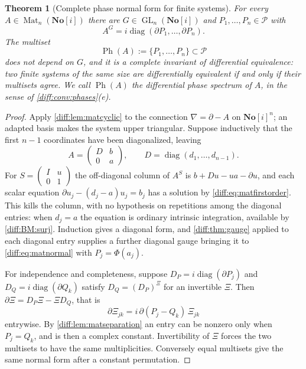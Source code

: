 \documentclass[11pt,letterpaper]{article}
\numberwithin{equation}{section}
\newtheorem{theorem}{Theorem}[section]
\theoremstyle{definition}
\theoremstyle{remark}
\newcommand{\SC}{\mathbf{No}[i]}
\newcommand{\der}{\partial}
\newcommand{\Pcl}{\mathcal P}
\newcommand{\Mat}{\operatorname{Mat}}
\newcommand{\GL}{\operatorname{GL}}
\newcommand{\Ph}{\operatorname{Ph}}
\begin{document}
\begin{theorem}[Complete phase normal form for finite systems]
\label{diff:thm:matnormal}
For every $A\in\Mat_{n}(\SC)$ there are $G\in\GL_{n}(\SC)$ and
$P_{1},\dots,P_{n}\in\Pcl$ with
\begin{equation}\label{diff:eq:matnormal}
 A^{G}=i\operatorname{diag}(\der P_{1},\dots,\der P_{n}) .
\end{equation}
The multiset
\[
 \Ph(A):=\{P_{1},\dots,P_{n}\}\subset\Pcl
\]
does not depend on $G$, and it is a \emph{complete} invariant of differential
equivalence: two finite systems of the same size are differentially equivalent
if and only if their multisets agree. We call $\Ph(A)$ the \emph{differential
phase spectrum} of $A$, in the sense of \cref{diff:conv:phases}(e).
\end{theorem}
\begin{proof}
Apply \cref{diff:lem:matcyclic} to the connection $\nabla=\der-A$ on $\SC^{n}$;
an adapted basis makes the system upper triangular. Suppose inductively that
the first $n-1$ coordinates have been diagonalized, leaving
\[
 A=\begin{pmatrix}D&b\\0&a\end{pmatrix},
 \qquad D=\operatorname{diag}(d_{1},\dots,d_{n-1}).
\]
For $S=\left(\begin{smallmatrix}I&u\\0&1\end{smallmatrix}\right)$ the
off-diagonal column of $A^{S}$ is $b+Du-ua-\der u$, and each scalar equation
$\der u_{j}-(d_{j}-a)u_{j}=b_{j}$ has a solution by
\cref{diff:eq:matfirstorder}. This kills the column, with no hypothesis on
repetitions among the diagonal entries: when $d_{j}=a$ the equation is
ordinary intrinsic integration, available by \ref{diff:BM:surj}. Induction
gives a diagonal form, and \cref{diff:thm:gauge} applied to each diagonal
entry supplies a further diagonal gauge bringing it to
\cref{diff:eq:matnormal} with $P_{j}=\Phi(a_{j})$.

For independence and completeness, suppose $D_{P}=i\operatorname{diag}(\der
P_{j})$ and $D_{Q}=i\operatorname{diag}(\der Q_{k})$ satisfy
$D_{Q}=(D_{P})^{\Xi}$ for an invertible $\Xi$. Then $\der\Xi=D_{P}\Xi-\Xi D_{Q}$, that
is
\begin{equation}\label{diff:eq:matintertwine}
 \der\Xi_{jk}=i\,\der(P_{j}-Q_{k})\,\Xi_{jk}
\end{equation}
entrywise. By \cref{diff:lem:matseparation} an entry can be nonzero only when
$P_{j}=Q_{k}$, and is then a complex constant. Invertibility of $\Xi$ forces the
two multisets to have the same multiplicities. Conversely equal multisets give
the same normal form after a constant permutation.
\end{proof}
\end{document}
